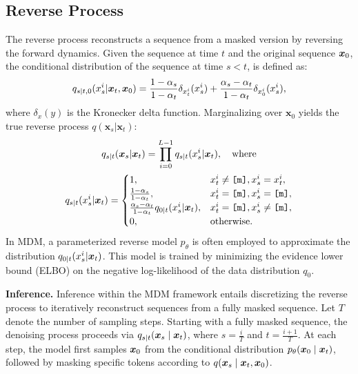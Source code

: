\subsection{Reverse Process}
The reverse process reconstructs a sequence from a masked version by reversing the forward dynamics. Given the sequence at time $t$ and the original sequence ${\bm{x}}_0$, the conditional distribution of the sequence at time $s<t$, is defined as:
\begin{equation*}
    q_{s|t,0}(x_s^i|{\bm{x}}_t, {\bm{x}}_0) = \frac{1-\alpha_s}{1-\alpha_t} \delta_{x_t^i}(x_s^i) + \frac{\alpha_s - \alpha_t}{1-\alpha_t} \delta_{x_0^i}(x_s^i),
\end{equation*}
where $\delta_{x}(y)$ is the Kronecker delta function. Marginalizing over $\mathbf{x}_0$ yields the true reverse process $q(\mathbf{x}_{s}|\mathbf{x}_t)$: 
\begin{equation}
\label{eq:rev_proc}
    \begin{gathered}
        q_{s|t}({\bm{x}}_s|{\bm{x}}_t) = \prod_{i=0}^{L-1} q_{s|t}(x_s^i|{\bm{x}}_t), \quad
        \text{where} \\ q_{s|t}(x_s^i|{\bm{x}}_t) =
        \begin{cases}
        1, & x_t^i \neq \texttt{[m]}, x_s^i = x_t^i, \\
        \frac{1-\alpha_s}{1-\alpha_t}, & x_t^i = \texttt{[m]} , x_s^i = \texttt{[m]}, \\
        \frac{\alpha_s - \alpha_t}{1-\alpha_t} q_{0|t}(x_s^i|{\bm{x}}_t), & x_t^i = \texttt{[m]} , x_s^i \neq \texttt{[m]}, \\
        0, & \text{otherwise.}
        \end{cases}
    \end{gathered}
\end{equation}
In MDM, a parameterized reverse model $p_\theta$ is often employed to approximate the distribution $q_{0|t}(x_s^i|{\bm{x}}_t)$. This model is trained by minimizing the evidence lower bound (ELBO) \citep{lou2024discrete,shi2024simplified,gong2024scaling,sahoo2024simple} on the negative log-likelihood of the data distribution $q_0$.

\textbf{Inference.}  
Inference within the MDM framework entails discretizing the reverse process to iteratively reconstruct sequences from a fully masked sequence. Let $T$ denote the number of sampling steps. Starting with a fully masked sequence, the denoising process proceeds via $q_{s|t}({\bm{x}}_s \mid {\bm{x}}_t)$, where $s = \frac{i}{T}$ and $t = \frac{i+1}{T}$. At each step, the model first samples ${\bm{x}}_0$ from the conditional distribution $p_\theta({\bm{x}}_0 \mid {\bm{x}}_t)$, followed by masking specific tokens according to $q({\bm{x}}_s \mid {\bm{x}}_t, {\bm{x}}_0)$. 


